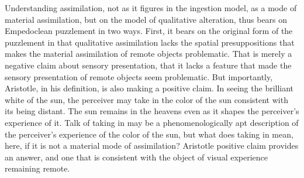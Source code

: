 Understanding assimilation, not as it figures in the ingestion model, as a mode of material assimilation, but on the model of qualitative alteration, thus bears on Empedoclean puzzlement in two ways. First, it bears on the original form of the puzzlement in that qualitative assimilation lacks the spatial presuppositions that makes the material assimilation of remote objects problematic. That is merely a negative claim about sensory presentation, that it lacks a feature that made the sensory presentation of remote objects seem problematic. But importantly, Aristotle, in his definition, is also making a positive claim. In seeing the brilliant white of the sun, the perceiver may take in the color of the sun consistent with its being distant. The sun remains in the heavens even as it shapes the perceiver's experience of it. Talk of taking in may be a phenomenologically apt description of the perceiver's experience of the color of the sun, but what does taking in mean, here, if it is not a material mode of assimilation? Aristotle positive claim provides an answer, and one that is consistent with the object of visual experience remaining remote. 

